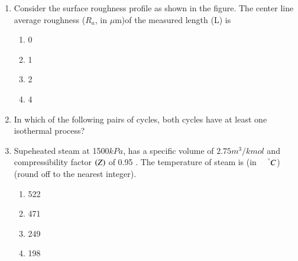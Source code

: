\documentclass[journal,12pt,onecolumn]{IEEEtran}
\theoremstyle{remark}
\begin{document}
\begin{enumerate}
    \item Consider the surface roughness profile as shown in the figure. The center line average 
        roughness ($R_a$, in $\mu$m)of the measured length (L) is
        \begin{center}
            \resizebox{0.5\textwidth}{!}{
                
            } 
        \end{center}
        \hfill{}
        \begin{multicols}{4}
            \begin{enumerate}
                \item 0
                    \columnbreak
                \item 1
                    \columnbreak
                \item 2
                    \columnbreak
                \item 4
            \end{enumerate}
        \end{multicols}

    \item In which of the following pairs of cycles, both cycles have at least one isothermal
        process?
        \hfill{}
            \begin{enumerate}
            \end{enumerate}

    \item Supeheated steam at 1500$kPa$, has a specific volume of $2.75 m^3/kmol$ and compressibility
        factor $\left(Z\right)$ of 0.95 . The temperature of steam is (in $\quad^{\degree}C$)\\
        (round off to the nearest integer).
        \hfill{}
        \begin{multicols}{4}
            \begin{enumerate}
                \item 522
                    \columnbreak
                \item 471
                    \columnbreak
                \item 249
                    \columnbreak
                \item 198
            \end{enumerate}
        \end{multicols}


\end{enumerate}
\end{document}
